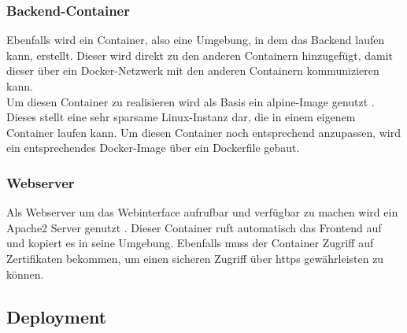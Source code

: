 		\subsubsection{Backend-Container}
		
		Ebenfalls wird ein Container, also eine Umgebung, in dem das Backend laufen kann, erstellt. Dieser wird direkt zu den anderen Containern hinzugefügt, damit dieser über ein Docker-Netzwerk mit den anderen Containern kommunizieren kann.~\\
		Um diesen Container zu realisieren wird als Basis ein alpine-Image genutzt \cite{alpine}. Dieses stellt eine sehr sparsame Linux-Instanz dar, die in einem eigenem Container laufen kann. Um diesen Container noch entsprechend anzupassen, wird ein entsprechendes Docker-Image über ein Dockerfile gebaut.
		
		\subsubsection{Webserver}
		
		Als Webserver um das Webinterface aufrufbar und verfügbar zu machen wird ein Apache2 Server genutzt \cite{apache}. Dieser Container ruft automatisch das Frontend auf und kopiert es in seine Umgebung. Ebenfalls muss der Container Zugriff auf Zertifikaten bekommen, um einen sicheren Zugriff über \gls{https} gewährleisten zu können.
				
	\subsection{Deployment}
	
